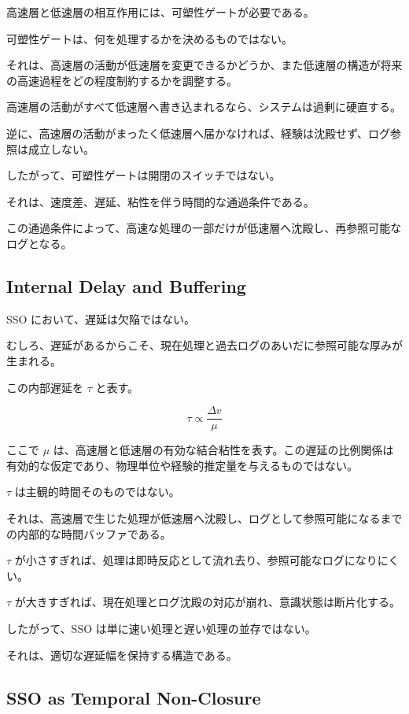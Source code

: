 高速層と低速層の相互作用には、可塑性ゲートが必要である。

可塑性ゲートは、何を処理するかを決めるものではない。

それは、高速層の活動が低速層を変更できるかどうか、また低速層の構造が将来の高速過程をどの程度制約するかを調整する。

高速層の活動がすべて低速層へ書き込まれるなら、システムは過剰に硬直する。

逆に、高速層の活動がまったく低速層へ届かなければ、経験は沈殿せず、ログ参照は成立しない。

したがって、可塑性ゲートは開閉のスイッチではない。

それは、速度差、遅延、粘性を伴う時間的な通過条件である。

この通過条件によって、高速な処理の一部だけが低速層へ沈殿し、再参照可能なログとなる。

\subsection{Internal Delay and Buffering}

SSO において、遅延は欠陥ではない。

むしろ、遅延があるからこそ、現在処理と過去ログのあいだに参照可能な厚みが生まれる。

この内部遅延を $\tau$ と表す。

\begin{equation}
\tau \propto \frac{\Delta v}{\mu}
\end{equation}

ここで $\mu$ は、高速層と低速層の有効な結合粘性を表す。この遅延の比例関係は有効的な仮定であり、物理単位や経験的推定量を与えるものではない。

$\tau$ は主観的時間そのものではない。

それは、高速層で生じた処理が低速層へ沈殿し、ログとして参照可能になるまでの内部的な時間バッファである。

$\tau$ が小さすぎれば、処理は即時反応として流れ去り、参照可能なログになりにくい。

$\tau$ が大きすぎれば、現在処理とログ沈殿の対応が崩れ、意識状態は断片化する。

したがって、SSO は単に速い処理と遅い処理の並存ではない。

それは、適切な遅延幅を保持する構造である。

\subsection{SSO as Temporal Non-Closure}


